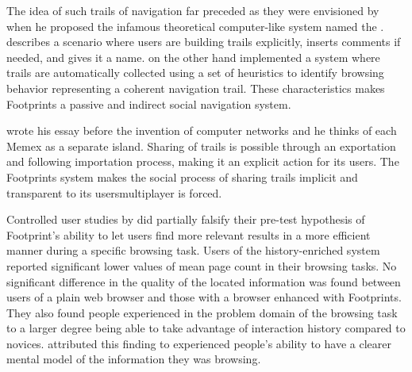 The idea of such trails of navigation far preceded \citeauthor{wexelblat99}
as they were envisioned by \citet{bush45} when he proposed the infamous
theoretical computer-like system named the .%
\citeauthor{bush45} describes a scenario where users are building trails
explicitly, inserts comments if needed, and gives it a name.
\citeauthor{wexelblat99} on the other hand
implemented a system where trails are automatically collected using a set of
heuristics to identify browsing behavior representing a coherent navigation
trail. These characteristics makes Footprints a passive and indirect social
navigation system.

\citeauthor{bush45} wrote his essay before the invention of computer networks
and he thinks of each Memex as a separate island. Sharing of trails is
possible through an exportation and following importation process, making it an
explicit action for its users.
The Footprints system makes the social process of sharing trails implicit and
transparent to its users\dash{}multiplayer is forced.

Controlled user studies by \citeauthor{wexelblat99} did partially falsify
their pre-test hypothesis of Footprint's ability to let users find more
relevant results in a more efficient manner during a specific browsing task.
Users of the history-enriched system reported significant lower values of mean
page count in their browsing tasks. No significant difference in the quality
of the located information was found between users of a
plain web browser and those with a browser enhanced with Footprints.
They also found people experienced in the problem domain of the browsing task
to a larger degree being able to take advantage of interaction history
compared to novices.
\citeauthor{wexelblat99} attributed this finding to experienced people's
ability to have a clearer mental model of the information they was browsing.

